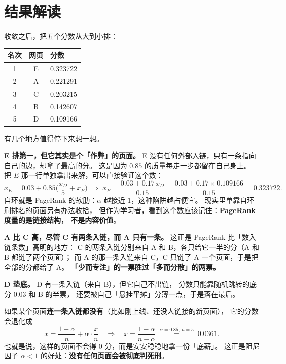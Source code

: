 \documentclass[UTF8,11pt,fontset=macnew]{ctexart}
\begin{document}
\section{结果解读}

收敛之后，把五个分数从大到小排：

\begin{center}
\begin{tabular}{c c l}
\toprule
名次 & 网页 & 分数 \\
\midrule
1 & E & 0.323722 \\
2 & A & 0.221291 \\
3 & C & 0.203215 \\
4 & B & 0.142607 \\
5 & D & 0.109166 \\
\bottomrule
\end{tabular}
\end{center}

有几个地方值得停下来想一想。

\textbf{E 排第一，但它其实是个「作弊」的页面。}
E 没有任何外部入链，只有一条指向自己的边，却拿了最高的分。
这是因为 $0.85$ 的质量每走一步都留在自己身上。
把 $E$ 那一行单独拿出来解，可以直接验证这个数：
\[
x_E = 0.03 + 0.85\Big(\frac{x_D}{5} + x_E\Big)
\;\Longrightarrow\;
x_E = \frac{0.03 + 0.17\,x_D}{0.15}
= \frac{0.03+0.17\times 0.109166}{0.15} = 0.323722 .
\]
自环就是 PageRank 的软肋：$\alpha$ 越接近 $1$，这种陷阱越占便宜。
现实里单靠自环刷排名的页面另有办法收拾，
但作为学习者，看到这个数应该记住：\textbf{PageRank 度量的是链接结构，
不是内容价值}。

\textbf{A 比 C 高，尽管 C 有两条入链，而 A 只有一条。}
这正是 PageRank 比「数入链条数」高明的地方：
C 的两条入链分别来自 A 和 B，各只给它一半的分（A 和 B 都链了两个页面）；
而 A 的那一条入链来自 C，C 只链了 A 一个页面，于是把全部的分都给了 A。
\textbf{「少而专注」的一票胜过「多而分散」的两票。}

\textbf{D 垫底。}
D 有一条入链（来自 B），但它自己不出链，
分数只能靠随机跳转的底分 $0.03$ 和 B 的半票，
还要被自己「悬挂平摊」分薄一点，于是落在最后。

\begin{keybox}[补一种没画进图里的情况]
如果某个页面\textbf{连一条入链都没有}（比如刚上线、还没人链接的新页面），
它的分数会退化成
\[
x = \frac{1-\alpha}{n} + \alpha\cdot\frac{x}{n}
\quad\Longrightarrow\quad
x = \frac{1-\alpha}{n-\alpha}
\;\stackrel{\alpha=0.85,\,n=5}{=}\; 0.0361 .
\]
也就是说，这样的页面不会得 $0$ 分，而是安安稳稳地拿一份「底薪」。
这正是阻尼因子 $\alpha<1$ 的好处：\textbf{没有任何页面会被彻底判死刑}。
\end{keybox}
\end{document}
